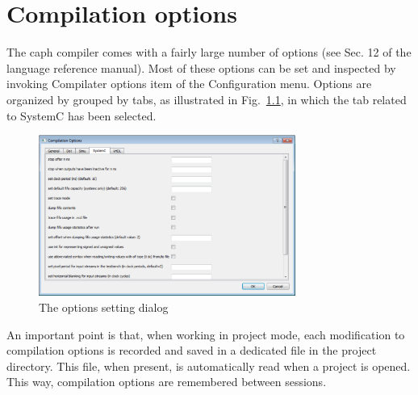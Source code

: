
\chapter{Compilation options}
\label{cha:ide-options}

The caph compiler comes with a fairly large number of options (see Sec. 12 of the language reference
manual). Most of these options can be set and inspected by invoking \textsf{Compilater options} item
of the \textsf{Configuration} menu. Options are organized by grouped by tabs, as illustrated in
Fig.~\ref{fig:options-sysc}, in which the tab related to SystemC has been selected.

\begin{figure}[h]
  \centering
  \includegraphics[width=0.75\textwidth]{figs/ide/options-sysc}
  \caption{The options setting dialog}
  \label{fig:options-sysc}
\end{figure}

\medskip An important point is that, when working in project mode, each modification to compilation
options is recorded and saved in a dedicated file in the project directory. This file, when present,
is automatically read when a project is opened. This way, compilation options are remembered between
sessions.

